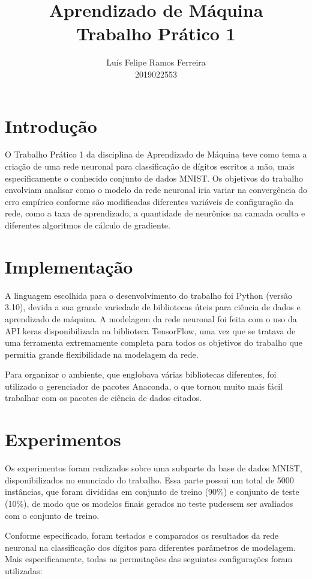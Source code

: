 \documentclass{article}
\title{Aprendizado de Máquina \\ Trabalho Prático 1}
\author{Luís Felipe Ramos Ferreira \\ 2019022553}
\begin{document}
\maketitle

\section{Introdução}

O Trabalho Prático 1 da disciplina de Aprendizado de Máquina teve como tema a criação de uma rede neuronal para classificação de dígitos escritos a mão, mais especificamente o conhecido conjunto de dados MNIST. Os objetivos do trabalho envolviam analisar como o modelo da rede neuronal iria variar na convergência do erro empírico conforme são modificadas diferentes variáveis de configuração da rede, como a taxa de aprendizado, a quantidade de neurônios na camada oculta e diferentes algoritmos de cálculo de gradiente.

\section{Implementação}

A linguagem escolhida para o desenvolvimento do trabalho foi Python (versão 3.10), devida a sua grande variedade de bibliotecas úteis para ciência de dados e aprendizado de máquina. A modelagem da rede neuronal foi feita com o uso da API keras disponibilizada na biblioteca TensorFlow, uma vez que se tratava de uma ferramenta extremamente completa para todos os objetivos do trabalho que permitia grande flexibilidade na modelagem da rede.

Para organizar o ambiente, que englobava várias bibliotecas diferentes, foi utilizado o gerenciador de pacotes Anaconda, o que tornou muito mais fácil trabalhar com os pacotes de ciência de dados citados.

\section{Experimentos}

Os experimentos foram realizados sobre uma subparte da base de dados MNIST, disponibilizados no enunciado do trabalho. Essa parte possui um total de 5000 instâncias, que foram divididas em conjunto de treino (90\%) e conjunto de teste (10\%), de modo
que os modelos finais gerados no teste pudessem ser avaliados com o conjunto de treino.

Conforme especificado, foram testados e comparados os resultados da rede neuronal na classificação dos dígitos para diferentes parâmetros de modelagem. Mais especificamente, todas as permutações das seguintes configurações foram utilizadas:
\end{document}
